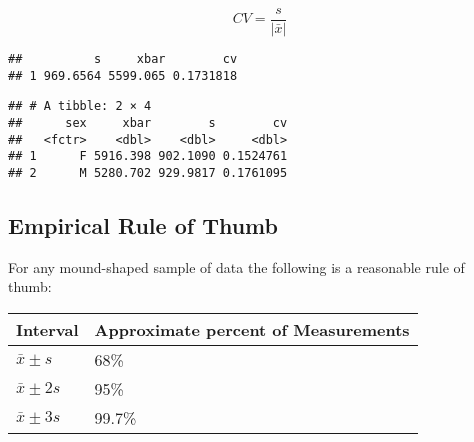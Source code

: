 \documentclass[]{book}
\newenvironment{Shaded}{\begin{snugshade}}{\end{snugshade}}
\newcommand{\KeywordTok}[1]{\textcolor[rgb]{0.13,0.29,0.53}{\textbf{{#1}}}}
\newcommand{\DataTypeTok}[1]{\textcolor[rgb]{0.13,0.29,0.53}{{#1}}}
\newcommand{\StringTok}[1]{\textcolor[rgb]{0.31,0.60,0.02}{{#1}}}
\newcommand{\CommentTok}[1]{\textcolor[rgb]{0.56,0.35,0.01}{\textit{{#1}}}}
\newcommand{\NormalTok}[1]{{#1}}
\begin{document}
\[CV=\frac{s}{\vert\bar{x}\vert}\]

\begin{Shaded}
\end{Shaded}

\begin{verbatim}
##          s     xbar        cv
## 1 969.6564 5599.065 0.1731818
\end{verbatim}

\begin{Shaded}
\end{Shaded}

\begin{verbatim}
## # A tibble: 2 × 4
##      sex     xbar        s        cv
##   <fctr>    <dbl>    <dbl>     <dbl>
## 1      F 5916.398 902.1090 0.1524761
## 2      M 5280.702 929.9817 0.1761095
\end{verbatim}

\subsection{Empirical Rule of Thumb}\label{empirical-rule-of-thumb}

For any mound-shaped sample of data the following is a reasonable rule
of thumb:

\begin{longtable}[]{@{}ll@{}}
\toprule
Interval & Approximate percent of Measurements\tabularnewline
\midrule
\endhead
\(\bar{x}\pm s\) & 68\%\tabularnewline
\(\bar{x}\pm 2s\) & 95\%\tabularnewline
\(\bar{x}\pm 3s\) & 99.7\%\tabularnewline
\bottomrule
\end{longtable}
\end{document}
